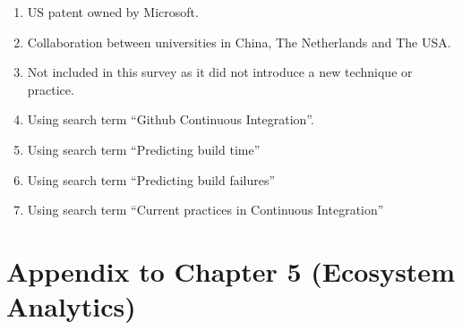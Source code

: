 \documentclass[]{book}
\providecommand{\tightlist}{%
  \setlength{\itemsep}{0pt}\setlength{\parskip}{0pt}}
\begin{document}
\begin{enumerate}
\def\labelenumi{\arabic{enumi}.}
\tightlist
\item
  US patent owned by Microsoft.
\item
  Collaboration between universities in China, The Netherlands and The
  USA.
\item
  Not included in this survey as it did not introduce a new technique or
  practice.
\item
  Using search term ``Github Continuous Integration''.
\item
  Using search term ``Predicting build time''
\item
  Using search term ``Predicting build failures''
\item
  Using search term ``Current practices in Continuous Integration''
\end{enumerate}

\section{Appendix to Chapter 5 (Ecosystem
Analytics)}\label{appendix-to-chapter-5-ecosystem-analytics}
\end{document}
